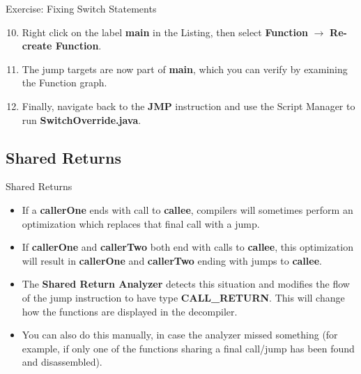 \documentclass{beamer}
\begin{document}
\begin{frame}
\begin{block}{Exercise: Fixing Switch Statements}
\begin{enumerate}
\setcounter{enumi}{9}
\item Right click on the label \textbf{main} in the Listing, then select \textbf{Function} $\rightarrow$ \textbf{Re-create Function}.
\item The jump targets are now part of \textbf{main}, which you can verify by examining the Function graph.
\item Finally, navigate back to the \textbf{JMP} instruction and use the Script Manager to run \textbf{SwitchOverride.java}.
\end{enumerate}
\end{block}
\end{frame}

\subsection{Shared Returns}
\begin{frame}
\begin{block}{Shared Returns}
\begin{itemize}
\item If a \textbf{callerOne} ends with call to \textbf{callee}, compilers will sometimes perform an optimization which replaces that final call with a jump.
\item If \textbf{callerOne} and \textbf{callerTwo} both end with calls to \textbf{callee}, this optimization will result in \textbf{callerOne} and \textbf{callerTwo} 
ending with jumps to \textbf{callee}.
\item The \textbf{Shared Return Analyzer} detects this situation and modifies the flow of the jump instruction to have type \textbf{CALL\_RETURN}. This will change how
the functions are displayed in the decompiler.
\item You can also do this manually, in case the analyzer missed something (for example, if only one of the functions sharing a final call/jump has been found and disassembled). 
\end{itemize}
\end{block}
\end{frame}
\end{document}
